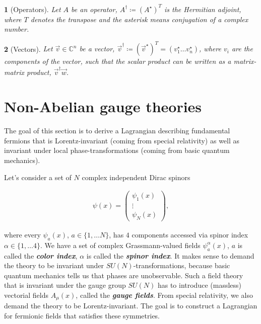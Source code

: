 \documentclass{article}
\theoremstyle{plain} %
\theoremstyle{convention} %
\newtheorem*{convention}{} %
\theoremstyle{remark} %
\def\df#1{\textbf{\textit{#1}}}
\numberwithin{equation}{section}
\begin{document}
\begin{convention}[Operators]
  Let $A$ be an operator, $A^{\dagger} \coloneqq (A^{\star})^T$ is the Hermitian adjoint, where $T$ denotes the transpose and the asterisk means conjugation of a complex number.
\end{convention}

\begin{convention}[Vectors]
  Let $\vec{v} \in \mathbb{C}^n$ be a vector, $\vec{v}^{\dagger} \coloneqq (\vec{v}^{\star})^T = (v^{\star}_1 \dots v^{\star}_n)$, where $v_i$ are the components of the vector, such that the scalar product can be written as a matrix-matrix product, $\vec{v}^{\dagger} \vec{w}$.
\end{convention}

\section{Non-Abelian gauge theories}

\label{sec:gauge_theories}

The goal of this section is to derive a Lagrangian describing fundamental fermions that is Lorentz-invariant (coming from special relativity) as well as invariant under local phase-transformations (coming from basic quantum mechanics).

Let's consider a set of $N$ complex independent Dirac spinors

\begin{align*}
    \psi(x) = \begin{pmatrix}
    \psi_1(x) \\
    \vdots \\
    \psi_N(x) 
    \end{pmatrix},
\end{align*}

where every $\psi_a(x)$, $a \in \{1, \dots N\}$, has $4$ components accessed via spinor index $\alpha \in \{1, \dots 4\}$. We have a set of complex Grassmann-valued fields $\psi_{a}^{\alpha}(x)$, $a$ is called the \df{color index}, $\alpha$ is called the \df{spinor index}. It makes sense to demand the theory to be invariant under $SU(N)$-transformations, because basic quantum mechanics tells us that phases are unobservable. Such a field theory that is invariant under the gauge group $SU(N)$ has to introduce (massless) vectorial fields $A_{\mu}(x)$, called the \df{gauge fields}. From special relativity, we also demand the theory to be Lorentz-invariant. The goal is to construct a Lagrangian for fermionic fields that satisfies these symmetries.
\end{document}
